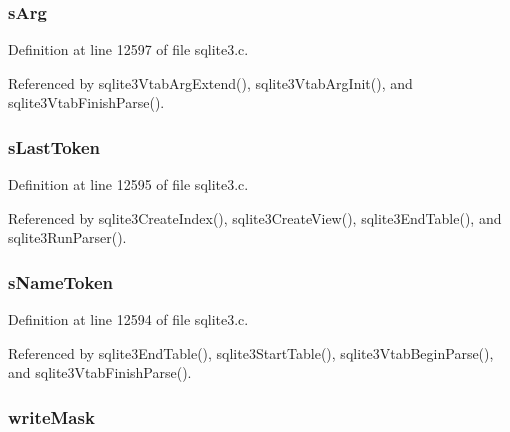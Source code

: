 \subsubsection[{s\+Arg}]{ s\+Arg}\label{struct_parse_a34c336844414b2c1bedbd11eac1f3567}


Definition at line 12597 of file sqlite3.\+c.



Referenced by sqlite3\+Vtab\+Arg\+Extend(), sqlite3\+Vtab\+Arg\+Init(), and sqlite3\+Vtab\+Finish\+Parse().

\hypertarget{struct_parse_ad72a7eb7cdb0855411e66aac2daddee6}{}
\subsubsection[{s\+Last\+Token}]{ s\+Last\+Token}\label{struct_parse_ad72a7eb7cdb0855411e66aac2daddee6}


Definition at line 12595 of file sqlite3.\+c.



Referenced by sqlite3\+Create\+Index(), sqlite3\+Create\+View(), sqlite3\+End\+Table(), and sqlite3\+Run\+Parser().

\hypertarget{struct_parse_ad1e8faf5ff45a16dd39d4b93503e1186}{}
\subsubsection[{s\+Name\+Token}]{ s\+Name\+Token}\label{struct_parse_ad1e8faf5ff45a16dd39d4b93503e1186}


Definition at line 12594 of file sqlite3.\+c.



Referenced by sqlite3\+End\+Table(), sqlite3\+Start\+Table(), sqlite3\+Vtab\+Begin\+Parse(), and sqlite3\+Vtab\+Finish\+Parse().

\hypertarget{struct_parse_a034fad25a08bebdfcb10fd5ef97010a9}{}
\subsubsection[{write\+Mask}]{ write\+Mask}\label{struct_parse_a034fad25a08bebdfcb10fd5ef97010a9}


